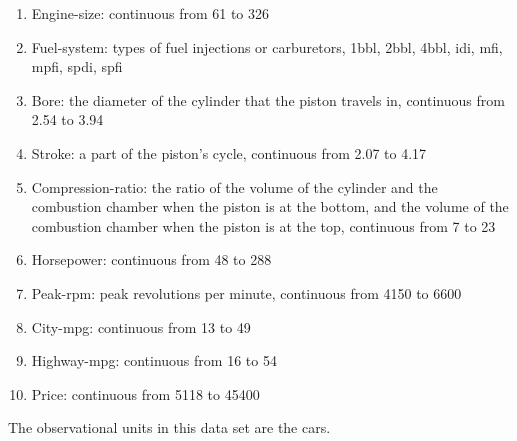 \documentclass{article}\usepackage[]{graphicx}\usepackage[]{color}
\begin{document}
\begin{enumerate}
\item Engine-size: continuous from 61 to 326

\item Fuel-system: types of fuel injections or carburetors, 1bbl, 2bbl, 4bbl, idi, mfi, mpfi, spdi, spfi

\item Bore: the diameter of the cylinder that the piston travels in, continuous from 2.54 to 3.94

\item Stroke: a part of the piston's cycle, continuous from 2.07 to 4.17 

\item Compression-ratio: the ratio of the volume of the cylinder and the combustion chamber when the piston is at the bottom, and the volume of the combustion chamber when the piston is at the top, continuous from 7 to 23

\item Horsepower: continuous from 48 to 288

\item Peak-rpm: peak revolutions per minute, continuous from 4150 to 6600

\item City-mpg: continuous from 13 to 49

\item Highway-mpg: continuous from 16 to 54

\item Price: continuous from 5118 to 45400

\end{enumerate}

The observational units in this data set are the cars. 
\end{document}
